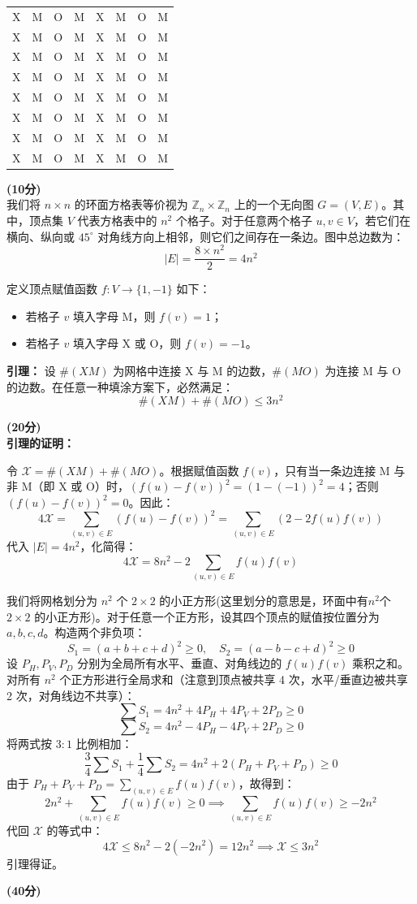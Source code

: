 \documentclass[zihao=5, a4paper]{ctexart}
\newcommand{\scoreB}[1]{\par\dotfill \textbf{(#1分)}\\}
\begin{document}
{\centering
\begin{tabular}{*{8}{c}}
X & M & O & M & X & M & O & M \\
X & M & O & M & X & M & O & M \\
X & M & O & M & X & M & O & M \\
X & M & O & M & X & M & O & M \\
X & M & O & M & X & M & O & M \\
X & M & O & M & X & M & O & M \\
X & M & O & M & X & M & O & M \\
X & M & O & M & X & M & O & M \\
\end{tabular}\par}
\scoreB{10}


我们将 $n \times n$ 的环面方格表等价视为 $\mathbb{Z}_n \times \mathbb{Z}_n$ 上的一个无向图 $G=(V, E)$。其中，顶点集 $V$ 代表方格表中的 $n^2$ 个格子。对于任意两个格子 $u, v \in V$，若它们在横向、纵向或 $45^\circ$ 对角线方向上相邻，则它们之间存在一条边。图中总边数为：
\[
|E| = \frac{8 \times n^2}{2} = 4n^2
\]

定义顶点赋值函数 $f: V \to \{1, -1\}$ 如下：
\begin{itemize}
    \item 若格子 $v$ 填入字母 M，则 $f(v) = 1$；
    \item 若格子 $v$ 填入字母 X 或 O，则 $f(v) = -1$。
\end{itemize}

\vspace{1em}

\large{\textbf{引理：}} \normalsize 设 $\#(XM)$ 为网格中连接 X 与 M 的边数，$\#(MO)$ 为连接 M 与 O 的边数。在任意一种填涂方案下，必然满足：
\[
\#(XM) + \#(MO) \le 3n^2
\]

\scoreB{20}

\textbf {\large{引理的证明：}} \normalsize

令 $\mathcal{X} = \#(XM) + \#(MO)$。根据赋值函数 $f(v)$，只有当一条边连接 M 与非 M（即 X 或 O）时，$(f(u) - f(v))^2 = (1 - (-1))^2 = 4$；否则 $(f(u) - f(v))^2 = 0$。因此：
\[
4\mathcal{X} = \sum_{(u,v) \in E} (f(u) - f(v))^2 = \sum_{(u,v) \in E} (2 - 2f(u)f(v))
\]
代入 $|E| = 4n^2$，化简得：
\[
4\mathcal{X} = 8n^2 - 2\sum_{(u,v) \in E} f(u)f(v)
\]

我们将网格划分为 $n^2$ 个 $2 \times 2$ 的小正方形(这里划分的意思是，环面中有$n^2$个 $2 \times 2$ 的小正方形)。对于任意一个正方形，设其四个顶点的赋值按位置分为 $a, b, c, d$。构造两个非负项：
\[
S_1 = (a + b + c + d)^2 \ge 0, \quad S_2 = (a - b - c + d)^2 \ge 0
\]
设 $P_H, P_V, P_D$ 分别为全局所有水平、垂直、对角线边的 $f(u)f(v)$ 乘积之和。对所有 $n^2$ 个正方形进行全局求和（注意到顶点被共享 4 次，水平/垂直边被共享 2 次，对角线边不共享）：
\[
\sum S_1 = 4n^2 + 4P_H + 4P_V + 2P_D \ge 0
\]
\[
\sum S_2 = 4n^2 - 4P_H - 4P_V + 2P_D \ge 0
\]
将两式按 $3 : 1$ 比例相加：
\[
\frac{3}{4} \sum S_1 + \frac{1}{4} \sum S_2 = 4n^2 + 2(P_H + P_V + P_D) \ge 0
\]
由于 $P_H + P_V + P_D = \sum_{(u,v) \in E} f(u)f(v)$，故得到：
\[
2n^2 + \sum_{(u,v) \in E} f(u)f(v) \ge 0 \implies \sum_{(u,v) \in E} f(u)f(v) \ge -2n^2
\]
代回 $\mathcal{X}$ 的等式中：
\[
4\mathcal{X} \le 8n^2 - 2(-2n^2) = 12n^2 \implies \mathcal{X} \le 3n^2
\]
引理得证。
\scoreB{40}
\end{document}
